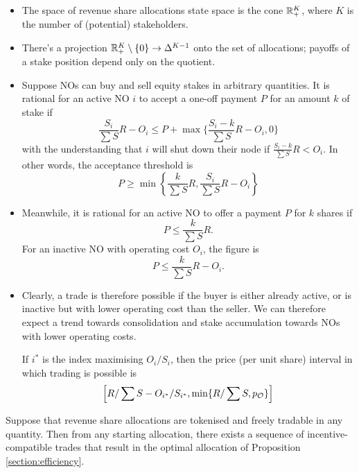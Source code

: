 \begin{itemize}

  \item The space of revenue share allocations state space is the cone $\mathbb{R}_+^K$, where $K$ is the number of (potential) stakeholders.

  \item There's a projection $\mathbb{R}_+^K\setminus\{0\}\rightarrow \Delta^{K-1}$ onto the set of allocations; payoffs of a stake position depend only on the quotient.

  \item Suppose NOs can buy and sell equity stakes in arbitrary quantities. 
  It is rational for an active NO $i$ to accept a one-off payment $P$ for an amount $k$ of stake if 
  \[
    \frac{S_i}{\sum S} R - O_i \leq P + \max\{ \frac{S_i-k}{\sum S} R - O_i, 0\}
  \]
  with the understanding that $i$ will shut down their node if $\frac{S_i-k}{\sum S}R<O_i$.
  In other words, the acceptance threshold is
  \[
    P \geq \min\left\{ \frac{k}{\sum S} R, \frac{S_i}{\sum S} R - O_i \right\}
  \]

  \item Meanwhile, it is rational for an active NO to offer a payment $P$ for $k$ shares if
  \[
    P \leq \frac{k}{\sum S}R.
  \]
  For an inactive NO with operating cost $O_i$, the figure is
  \[
    P \leq \frac{k}{\sum S}R - O_i.
  \]

  \item Clearly, a trade is therefore possible if the buyer is either already active, or is inactive but with lower operating cost than the seller.
  We can therefore expect a trend towards consolidation and stake accumulation towards NOs with lower operating costs.
  
  If $i^*$ is the index maximising $O_i/S_i$, then the price (per unit share) interval in which trading is possible is
  \[
    \left[ R/\sum S - O_{i^*}/S_{i^*}, \min\{ R/\sum S, p_{\mathcal{O}} \} \right]
  \]

\end{itemize}

\begin{proposition*}

  Suppose that revenue share allocations are tokenised and freely tradable in any quantity.
  Then from any starting allocation, there exists a sequence of incentive-compatible trades that result in the optimal allocation of Proposition \ref{section:efficiency}.

\end{proposition*}


